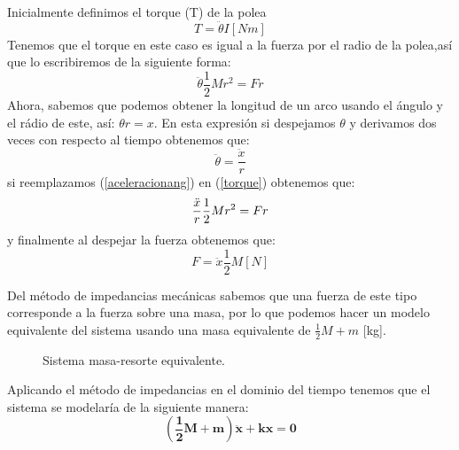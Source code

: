 \documentclass[letterpaper, 12pt]{article}
\begin{document}
\begin{enumerate}
Inicialmente definimos el torque (T) de la polea
    \begin{equation}
    T=\ddot{\theta}I \left[Nm\right]
    \end{equation}
Tenemos que el torque en este caso es igual a la fuerza por el radio de la polea,así que lo escribiremos de la siguiente forma:
    \begin{equation}
    \ddot{\theta}\frac{1}{2}Mr^2=Fr
    \label{torque}
    \end{equation}
Ahora, sabemos que podemos obtener la longitud de un arco usando el ángulo y el rádio de este, así: $\theta r=x$.
En esta expresión si despejamos $\theta$ y derivamos dos veces con respecto al tiempo obtenemos que:
    \begin{equation}
    \ddot{\theta}=\frac{\ddot{x}}{r}
    \label{aceleracionang}
    \end{equation}
si reemplazamos (\ref{aceleracionang}) en (\ref{torque}) obtenemos que:
\begin{equation}
\notag
   \frac{\ddot{x}}{r}\frac{1}{2}Mr^2=Fr
    \end{equation}
y finalmente al despejar la fuerza obtenemos que: 
\begin{equation}
   F=\ddot{x}\frac{1}{2}M  \left[N\right]
    \end{equation}
    
Del método de impedancias mecánicas sabemos que una fuerza de este tipo corresponde a la fuerza sobre una masa, por lo que podemos hacer un modelo equivalente del sistema usando una masa equivalente de $\frac{1}{2}M+m$ [kg].

\begin{figure}[H]
\centering
{}
 \caption{Sistema masa-resorte equivalente.}
\end{figure}
Aplicando el método de impedancias en el dominio del tiempo tenemos que el sistema se modelaría de la siguiente manera:
\begin{equation}
\mathbf{
    \left(\frac{1}{2}M+m\right)\ddot{x}+kx=0}
\end{equation}


\end{enumerate}
\end{document}
